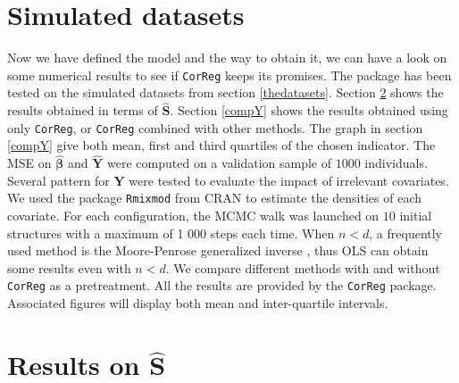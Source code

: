 \documentclass[12pt,a4paper]{report}
\begin{document}
	\section{Simulated datasets}	
	Now we have defined the model and the way to obtain it, we can have a look on some numerical results to see if {\tt CorReg} 	keeps its promises.
	The package has been tested on the simulated datasets from section \ref{thedatasets}.
Section \ref{compZ} shows the results obtained in terms of $\hat{\boldsymbol{S}}$. Section \ref{compY} shows the results obtained using only {\tt CorReg}, or {\tt CorReg} combined with other methods. The graph in section \ref{compY} give both mean, first and third quartiles of the chosen indicator. The MSE on $\hat{\boldsymbol{\beta}}$ and $\hat{\boldsymbol{Y}}$ were computed on a validation sample of $1 000$ individuals. Several pattern for $\boldsymbol{Y}$ were tested to evaluate the impact of irrelevant covariates.\\

	We used the package { \tt Rmixmod} from CRAN \cite{packageRmixmod} to estimate the densities of each covariate. For each configuration, the MCMC walk was launched on $10$ initial structures with a maximum of 1 000 steps each time.
	When $n<d$, a frequently used method is the Moore-Penrose generalized inverse \cite{katsikis2008fast}, thus OLS can obtain some results even with $n<d$. %
	We compare different methods with and without {\tt CorReg} as a pretreatment. All the results are provided by the {\tt CorReg} package. Associated figures will display both mean and inter-quartile intervals.
	
		\section{Results on $\hat{\boldsymbol{S}}$}	\label{compZ}
\end{document}
